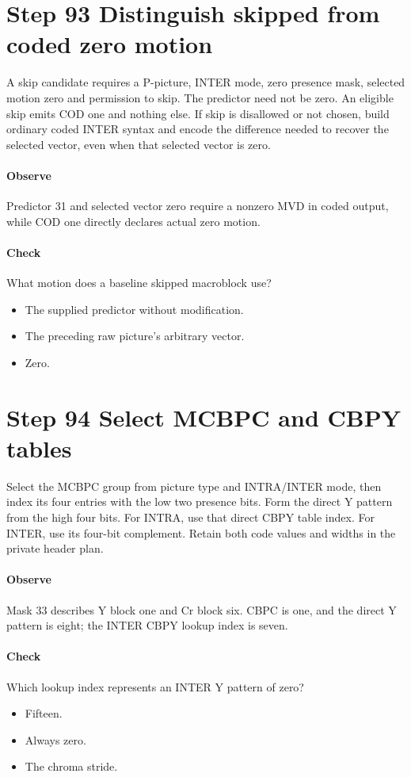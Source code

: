 \section{Step 93 Distinguish skipped from coded zero motion}\label{h263-syntax-s03}
A skip candidate requires a P-picture, INTER mode, zero presence mask, selected
motion zero and permission to skip. The predictor need not be zero. An eligible
skip emits COD one and nothing else. If skip is disallowed or not chosen, build
ordinary coded INTER syntax and encode the difference needed to recover the
selected vector, even when that selected vector is zero.

\paragraph{Observe} Predictor 31 and selected vector zero require a nonzero MVD
in coded output, while COD one directly declares actual zero motion.
\paragraph{Check} What motion does a baseline skipped macroblock use?
\begin{itemize}
  \item[A.] The supplied predictor without modification.
  \item[B.] The preceding raw picture's arbitrary vector.
  \item[C.] Zero.
\end{itemize}

\section{Step 94 Select MCBPC and CBPY tables}\label{h263-syntax-s04}
Select the MCBPC group from picture type and INTRA/INTER mode, then index its
four entries with the low two presence bits. Form the direct Y pattern from
the high four bits. For INTRA, use that direct CBPY table index. For INTER, use
its four-bit complement. Retain both code values and widths in the private header plan.

\paragraph{Observe} Mask 33 describes Y block one and Cr block six. CBPC is one,
and the direct Y pattern is eight; the INTER CBPY lookup index is seven.
\paragraph{Check} Which lookup index represents an INTER Y pattern of zero?
\begin{itemize}
  \item[A.] Fifteen.
  \item[B.] Always zero.
  \item[C.] The chroma stride.
\end{itemize}

